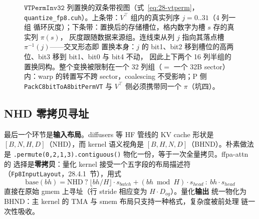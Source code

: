 \begin{figure}[H]
\caption{$\texttt{VTPermInv32}$ 列置换的双条带视图（式~\eqref{eq:28-vtperm}，
\texttt{quantize\_fp8.cuh}）。上条带：$V^{\top}$ 组内的真实列序 $j=0..31$（4 列一组
循环灰度）；下条带：置换后的存储槽位，格内数字为槽 $s$ 存的真实列 $\pi(s)$，
灰度跟随数据来源组。连线束从列 $j$ 指向其落点槽 $\pi^{-1}(j)$——交叉形态即
置换本身：$j$ 的 bit1、bit2 移到槽位的高两位、bit3 移到 bit1、bit0 与 bit4 不动，
因此上下两个 16 列半组的置换同构。整个变换被限制在一个 32 列组（$=$ 一个 32B
sector）内：warp 的转置写不跨 sector，coalescing 不受影响；P 侧
\texttt{PackC8bitToA8bitPermVT} 与 $V^{\top}$ 侧必须携带同一个 $\pi$（坑四）。}
\label{fig:28-vtperm}
\end{figure}

\subsection{NHD 零拷贝寻址}\label{sec:28-nhd}

最后一个环节是\textbf{输入布局}。diffusers 等 HF 管线的 KV cache 形状是
$[B, N, H, D]$（NHD），而 kernel 语义视角是 $[B, H, N, D]$（BHND）。朴素做法是
\texttt{.permute(0,2,1,3).contiguous()} 物化一份，等于一次全量拷贝。ffpa-attn 的
选择是\textbf{零拷贝}：量化 kernel 接受一个五字段的布局描述符
（\texttt{Fp8InputLayout}，28.4.1~节），用式
\begin{equation}
  \mathrm{base}(bh) = \mathrm{NHD}\ ?\ \lfloor bh/H\rfloor\cdot s_{batch}
  + (bh \bmod H)\cdot s_{head}\ :\ bh\cdot s_{head}
  \label{eq:28-plane-base}
\end{equation}
直接在原始 gmem 上寻址（行 stride 相应变为 $H\cdot D_{og}$）。量化\textbf{输出}
统一物化为 BHND：主 kernel 的 TMA 与 smem 布局只支持一种格式，复杂度被前处理
链一次性吸收。

